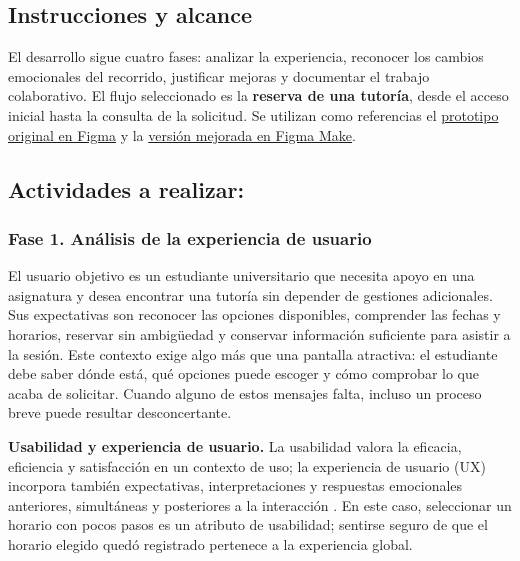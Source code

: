 \documentclass[10pt,letterpaper]{article}
\begin{document}
\subsection{Instrucciones y alcance}
El desarrollo sigue cuatro fases: analizar la experiencia, reconocer los cambios emocionales del recorrido, justificar mejoras y documentar el trabajo colaborativo. El flujo seleccionado es la \textbf{reserva de una tutoría}, desde el acceso inicial hasta la consulta de la solicitud. Se utilizan como referencias el \href{https://www.figma.com/design/29MZTBqWJW2xWDvboivtpg/Sin-t%C3%ADtulo?node-id=0-1}{prototipo original en Figma} y la \href{https://www.figma.com/make/pq9CHFHSQ0c5645wQdZ0lw/Tutor%C3%ADa-F%C3%A1cil-UTA-App}{versión mejorada en Figma Make}.

\subsection{Actividades a realizar:}
\subsubsection{Fase 1. Análisis de la experiencia de usuario}
El usuario objetivo es un estudiante universitario que necesita apoyo en una asignatura y desea encontrar una tutoría sin depender de gestiones adicionales. Sus expectativas son reconocer las opciones disponibles, comprender las fechas y horarios, reservar sin ambigüedad y conservar información suficiente para asistir a la sesión. Este contexto exige algo más que una pantalla atractiva: el estudiante debe saber dónde está, qué opciones puede escoger y cómo comprobar lo que acaba de solicitar. Cuando alguno de estos mensajes falta, incluso un proceso breve puede resultar desconcertante.

\textbf{Usabilidad y experiencia de usuario.} La usabilidad valora la eficacia, eficiencia y satisfacción en un contexto de uso; la experiencia de usuario (UX) incorpora también expectativas, interpretaciones y respuestas emocionales anteriores, simultáneas y posteriores a la interacción \cite{iso924111,iso9241210}. En este caso, seleccionar un horario con pocos pasos es un atributo de usabilidad; sentirse seguro de que el horario elegido quedó registrado pertenece a la experiencia global.
\end{document}
